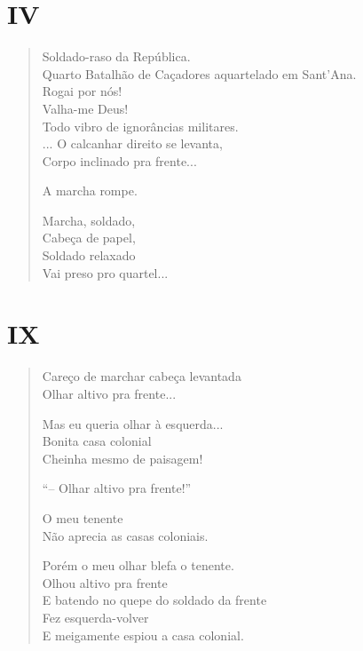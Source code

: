 \chapter[IV -- ``Soldado-raso da República.'']{IV}

\begin{verse}
Soldado-raso da República.\\
Quarto Batalhão de Caçadores aquartelado em Sant'Ana.\\
\quad\quad\quad\quad\quad\quad{}Rogai por nós!\\
\quad\quad\quad\quad\quad{}Valha-me Deus!\\
\quad\quad\quad{}Todo vibro de ignorâncias militares.\\
\quad\quad{}... O calcanhar direito se levanta,\\
\quad\quad{}Corpo inclinado pra frente...

A marcha rompe.

\quad\quad\quad{}Marcha, soldado,\\
\quad\quad\quad{}Cabeça de papel,\\
\quad\quad\quad{}Soldado relaxado\\
\quad\quad\quad{}Vai preso pro quartel...
\end{verse}

\chapter[IX -- ``Careço de marchar cabeça levantada'']{IX}

\begin{verse}
Careço de marchar cabeça levantada\\
Olhar altivo pra frente...

Mas eu queria olhar à esquerda...\\
\quad\quad\quad\quad{}Bonita casa colonial\\
\quad\quad\quad\quad{}Cheinha mesmo de paisagem!

``-- Olhar altivo pra frente!''

O meu tenente\\
Não aprecia as casas coloniais.

Porém o meu olhar blefa o tenente.\\
Olhou altivo pra frente\\
E batendo no quepe do soldado da frente\\
Fez esquerda-volver\\
E meigamente espiou a casa colonial.
\end{verse}

